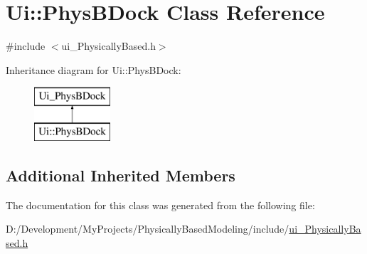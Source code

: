 \hypertarget{class_ui_1_1_phys_b_dock}{\section{Ui\-:\-:Phys\-B\-Dock Class Reference}
\label{class_ui_1_1_phys_b_dock}
}


{\ttfamily \#include $<$ui\-\_\-\-Physically\-Based.\-h$>$}

Inheritance diagram for Ui\-:\-:Phys\-B\-Dock\-:\begin{figure}[H]
\begin{center}
\leavevmode
\includegraphics[height=2.000000cm]{class_ui_1_1_phys_b_dock}
\end{center}
\end{figure}
\subsection*{Additional Inherited Members}


The documentation for this class was generated from the following file\-:\begin{DoxyCompactItemize}
\item 
D\-:/\-Development/\-My\-Projects/\-Physically\-Based\-Modeling/include/\hyperlink{ui___physically_based_8h}{ui\-\_\-\-Physically\-Based.\-h}\end{DoxyCompactItemize}
